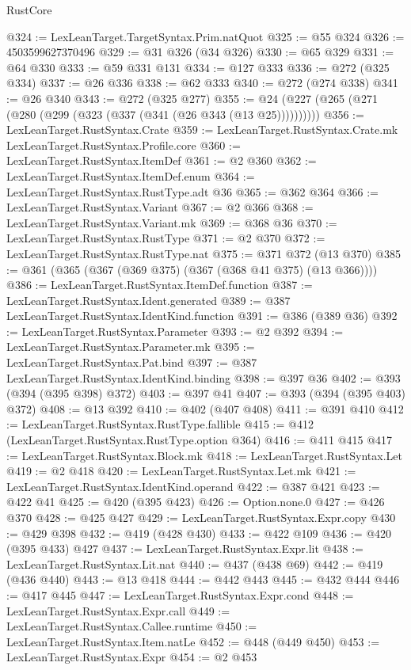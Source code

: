 \begin{lexlean}{RustCore}
\begin{coremodule}
@324 := LexLeanTarget.TargetSyntax.Prim.natQuot
@325 := @55 @324
@326 := 4503599627370496
@329 := @31 @326 (@34 @326)
@330 := @65 @329
@331 := @64 @330
@333 := @59 @331 @131
@334 := @127 @333
@336 := @272 (@325 @334)
@337 := @26 @336
@338 := @62 @333
@340 := @272 (@274 @338)
@341 := @26 @340
@343 := @272 (@325 @277)
@355 := @24 (@227 (@265 (@271 (@280 (@299 (@323 (@337 (@341 (@26 @343 (@13 @25))))))))))
@356 := LexLeanTarget.RustSyntax.Crate
@359 := LexLeanTarget.RustSyntax.Crate.mk LexLeanTarget.RustSyntax.Profile.core
@360 := LexLeanTarget.RustSyntax.ItemDef
@361 := @2 @360
@362 := LexLeanTarget.RustSyntax.ItemDef.enum
@364 := LexLeanTarget.RustSyntax.RustType.adt @36
@365 := @362 @364
@366 := LexLeanTarget.RustSyntax.Variant
@367 := @2 @366
@368 := LexLeanTarget.RustSyntax.Variant.mk
@369 := @368 @36
@370 := LexLeanTarget.RustSyntax.RustType
@371 := @2 @370
@372 := LexLeanTarget.RustSyntax.RustType.nat
@375 := @371 @372 (@13 @370)
@385 := @361 (@365 (@367 (@369 @375) (@367 (@368 @41 @375) (@13 @366))))
@386 := LexLeanTarget.RustSyntax.ItemDef.function
@387 := LexLeanTarget.RustSyntax.Ident.generated
@389 := @387 LexLeanTarget.RustSyntax.IdentKind.function
@391 := @386 (@389 @36)
@392 := LexLeanTarget.RustSyntax.Parameter
@393 := @2 @392
@394 := LexLeanTarget.RustSyntax.Parameter.mk
@395 := LexLeanTarget.RustSyntax.Pat.bind
@397 := @387 LexLeanTarget.RustSyntax.IdentKind.binding
@398 := @397 @36
@402 := @393 (@394 (@395 @398) @372)
@403 := @397 @41
@407 := @393 (@394 (@395 @403) @372)
@408 := @13 @392
@410 := @402 (@407 @408)
@411 := @391 @410
@412 := LexLeanTarget.RustSyntax.RustType.fallible
@415 := @412 (LexLeanTarget.RustSyntax.RustType.option @364)
@416 := @411 @415
@417 := LexLeanTarget.RustSyntax.Block.mk
@418 := LexLeanTarget.RustSyntax.Let
@419 := @2 @418
@420 := LexLeanTarget.RustSyntax.Let.mk
@421 := LexLeanTarget.RustSyntax.IdentKind.operand
@422 := @387 @421
@423 := @422 @41
@425 := @420 (@395 @423)
@426 := Option.none.{0}
@427 := @426 @370
@428 := @425 @427
@429 := LexLeanTarget.RustSyntax.Expr.copy
@430 := @429 @398
@432 := @419 (@428 @430)
@433 := @422 @109
@436 := @420 (@395 @433) @427
@437 := LexLeanTarget.RustSyntax.Expr.lit
@438 := LexLeanTarget.RustSyntax.Lit.nat
@440 := @437 (@438 @69)
@442 := @419 (@436 @440)
@443 := @13 @418
@444 := @442 @443
@445 := @432 @444
@446 := @417 @445
@447 := LexLeanTarget.RustSyntax.Expr.cond
@448 := LexLeanTarget.RustSyntax.Expr.call
@449 := LexLeanTarget.RustSyntax.Callee.runtime
@450 := LexLeanTarget.RustSyntax.Item.natLe
@452 := @448 (@449 @450)
@453 := LexLeanTarget.RustSyntax.Expr
@454 := @2 @453

\end{coremodule}
\end{lexlean}
